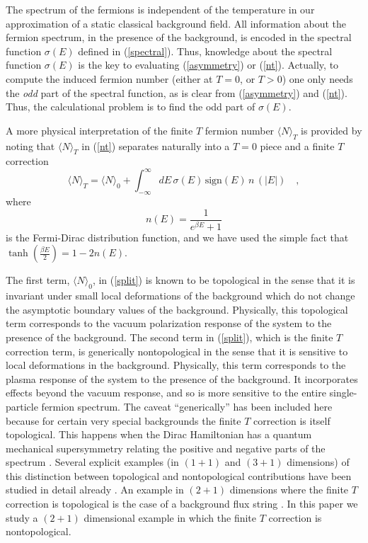 \documentclass[a4paper,prd]{revtex4}
\begin{document}
The spectrum of the fermions is independent of the temperature in our approximation of
a static classical background field. All information about the fermion spectrum, in
the presence of the background, is encoded in the spectral function 
$\sigma(E)$ defined in
(\ref{spectral}). Thus, knowledge about the spectral function
$\sigma(E)$ is the key to evaluating (\ref{asymmetry}) or
(\ref{nt}). Actually, to compute the induced fermion number (either at
$T=0$, or $T>0$) one only needs the {\it odd} part of the spectral
function, as is clear from (\ref{asymmetry}) and (\ref{nt}). Thus, the
calculational problem is to find the odd part of $\sigma(E)$. 


A more physical interpretation of the finite $T$ fermion number
$\langle N\rangle _T$ is provided by noting \cite{dr,leipzig} that 
$\langle N\rangle_T$ in (\ref{nt}) separates naturally into a
$T=0$ piece and a finite $T$ correction
\begin{equation}
\langle N\rangle _T=\langle N\rangle _0 +\int_{-\infty}^{\infty}dE \,\sigma (E) 
\,\textrm{sign}(E)\, n\,(|E|)\quad ,
\label{split}
\end{equation}
where
\begin{equation}
n(E)=\frac{1}{e^{\beta E}+1}
\label{fd}
\end{equation}
is the Fermi-Dirac distribution function, and we have used the simple fact that
$\tanh(\frac{\beta E}{2})=1-2n(E)$.

The first term, $\langle N \rangle_0 $, in (\ref{split}) is known to be topological 
in the sense that it is invariant under small local deformations of the background
which do not change the asymptotic boundary values of the background. Physically,
this topological term corresponds to the vacuum polarization response of the system
to the presence of the background. The second term in (\ref{split}), which is the
finite $T$ correction term, is generically nontopological in the sense that it is
sensitive to local deformations in the background. Physically, this term corresponds
to the plasma response of the system to the presence of the background. It
incorporates effects beyond the vacuum response, and so is more sensitive to the
entire single-particle fermion spectrum. The caveat ``generically'' has been included
here because for certain very special backgrounds the finite $T$ correction is itself
topological. This happens when the Dirac Hamiltonian has a quantum 
mechanical supersymmetry
relating the positive and negative parts of the spectrum \cite{dr,leipzig}. Several
explicit examples (in $(1+1)$ and $(3+1)$ dimensions) of this distinction
between topological and nontopological contributions have been studied
in detail already \cite{ad,dr,leipzig}. 
An example in $(2+1)$ dimensions where the finite $T$ correction is
topological is the case of a background flux string
\cite{cesar,cp,monopole}. In this paper we study a
$(2+1)$ dimensional example in which the finite $T$ correction is
nontopological. 
\end{document}
